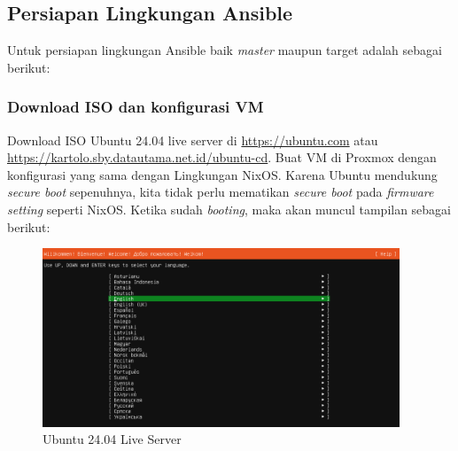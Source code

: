\documentclass[10pt,]{report}
\begin{document}
\begin{adjustwidth}{20pt}{}
	\subsection{Persiapan Lingkungan Ansible}
	\begin{adjustwidth}{20pt}{}
		Untuk persiapan lingkungan Ansible baik \textit{master} maupun target adalah
		sebagai berikut:
	\end{adjustwidth}
	\subsubsection{Download ISO dan konfigurasi VM}
	\begin{adjustwidth}{20pt}{}
		Download ISO Ubuntu 24.04 live server di \url{https://ubuntu.com} atau
		\url{https://kartolo.sby.datautama.net.id/ubuntu-cd}. Buat VM di Proxmox
		dengan konfigurasi yang sama dengan Lingkungan NixOS. Karena Ubuntu mendukung
		\textit{secure boot} sepenuhnya, kita tidak perlu mematikan \textit{secure boot}
		pada \textit{firmware setting} seperti NixOS.
		Ketika sudah \textit{booting}, maka akan muncul tampilan sebagai berikut:
		\begin{figure}[H]
			\begin{center}
				\includegraphics[width=0.95\textwidth]{images/ansible-nix-0.png}
			\end{center}
			\caption{Ubuntu 24.04 Live Server}
		\end{figure}

	\end{adjustwidth}

\end{adjustwidth}
\end{document}
